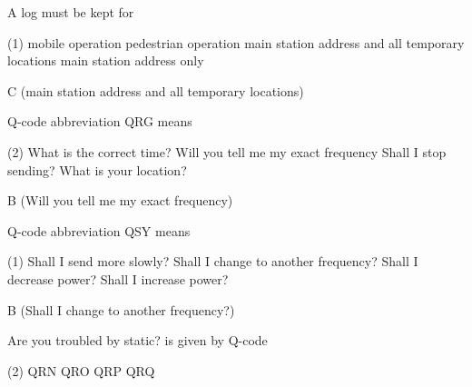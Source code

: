 \documentclass[a4paper]{article}
\begin{document}
\begin{question}A log must be kept for
	\begin{tasks}(1)
		\task mobile operation
		\task pedestrian operation
		\task main station address and all temporary locations
		\task main station address only
	\end{tasks}
\end{question}

\begin{solution}
	C (main station address and all temporary locations)
\end{solution}

\vspace{5mm}



\begin{question}Q-code abbreviation \apostrophe{}QRG\apostrophe{} means
	\begin{tasks}(2)
		\task What is the correct time?
		\task Will you tell me my exact frequency
		\task Shall I stop sending?
		\task What is your location?
	\end{tasks}
\end{question}

\begin{solution}
	B (Will you tell me my exact frequency)\textsl{}
\end{solution}

\vspace{5mm}



\begin{question}Q-code abbreviation \apostrophe{}QSY\apostrophe{} means
	\begin{tasks}(1)
		\task Shall I send more slowly?
		\task Shall I change to another frequency?
		\task Shall I decrease power?
		\task Shall I increase power?
	\end{tasks}
\end{question}

\begin{solution}
	B (Shall I change to another frequency?)
\end{solution}

\vspace{5mm}



\begin{question}\apostrophe{}Are you troubled by static?\apostrophe{} is given by Q-code
	\begin{tasks}(2)
		\task QRN
		\task QRO
		\task QRP
		\task QRQ
	\end{tasks}
\end{question}
\end{document}
